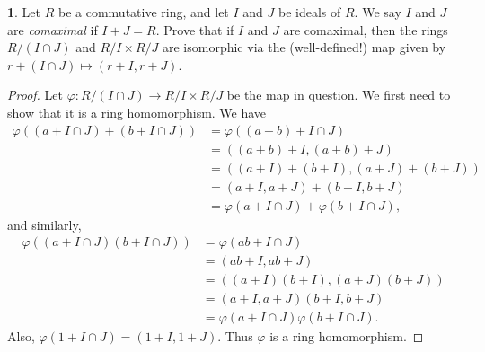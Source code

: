 \documentclass[12pt]{article}
\theoremstyle{definition}
\newtheorem{ex}{}
\begin{document}
\begin{ex}
	Let $R$ be a commutative ring, and let $I$ and $J$ be ideals of $R$.
	We say $I$ and $J$ are \textit{comaximal} if $I + J = R$.
	Prove that if $I$ and $J$ are comaximal, then the rings $R/(I\cap J)$ and $R/I \times R/J$ are isomorphic via the (well-defined!) map given by $r + (I \cap J) \mapsto (r + I, r + J)$.
\end{ex}
\begin{proof}
	Let $\varphi : R/(I\cap J) \to R/I \times R/J$ be the map in question.
	We first need to show that it is a ring homomorphism.
	We have \begin{align*}
		\varphi \left( (a + I \cap J) + (b + I \cap J) \right) & = \varphi ((a + b) + I \cap J)                   \\
		                                                       & = ((a + b) + I, (a + b) + J)                     \\
		                                                       & = ((a + I) + (b + I), (a + J) + (b + J))         \\
		                                                       & = (a + I, a + J) + (b + I, b + J)                \\
		                                                       & = \varphi(a + I \cap J) + \varphi(b + I \cap J),
	\end{align*}
	and similarly, \begin{align*}
		\varphi \left( (a + I \cap J)(b + I \cap J) \right) & = \varphi(ab + I\cap J)                       \\
		                                                    & = (ab + I, ab + J)                            \\
		                                                    & = ((a + I)(b + I), (a + J)(b + J))            \\
		                                                    & = (a + I, a + J)(b + I, b + J)                \\
		                                                    & = \varphi(a + I \cap J)\varphi(b + I \cap J).
	\end{align*}
	Also, $\varphi(1 + I \cap J) = (1 + I, 1 + J)$.
	Thus $\varphi$ is a ring homomorphism.


\end{proof}
\end{document}
